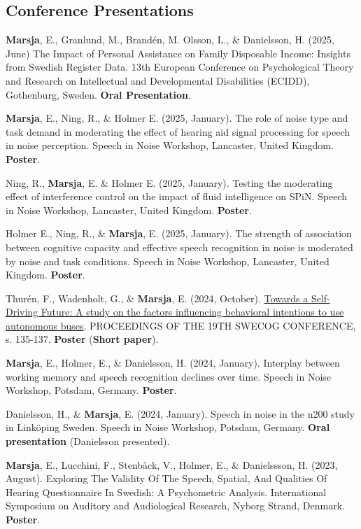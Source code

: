 \documentclass[]{article}
\begin{document}
\subsection{Conference Presentations}\label{conference-presentations}

\textbf{Marsja}, E., Granlund, M., Brandén, M. Olsson, L., \&
Danielsson, H. (2025, June) The Impact of Personal Assistance on Family
Disposable Income: Insights from Swedish Register Data. 13th European
Conference on Psychological Theory and Research on Intellectual and
Developmental Disabilities (ECIDD), Gothenburg, Sweden. \textbf{Oral
Presentation}.

\textbf{Marsja}, E., Ning, R., \& Holmer E. (2025, January). The role of
noise type and task demand in moderating the effect of hearing aid
signal processing for speech in noise perception. Speech in Noise
Workshop, Lancaster, United Kingdom. \textbf{Poster}.

Ning, R., \textbf{Marsja}, E. \& Holmer E. (2025, January). Testing the
moderating effect of interference control on the impact of fluid
intelligence on SPiN. Speech in Noise Workshop, Lancaster, United
Kingdom. \textbf{Poster}.

Holmer E., Ning, R., \& \textbf{Marsja}, E. (2025, January). The
strength of association between cognitive capacity and effective speech
recognition in noise is moderated by noise and task conditions. Speech
in Noise Workshop, Lancaster, United Kingdom. \textbf{Poster}.

Thurén, F., Wadenholt, G., \& \textbf{Marsja}, E. (2024, October).
\href{https://swecog.se/files/SweCog2024_Proceedings.pdf}{Towards a
Self-Driving Future: A study on the factors influencing behavioral
intentions to use autonomous buses}. PROCEEDINGS OF THE 19TH SWECOG
CONFERENCE, s. 135-137. \textbf{Poster} (\textbf{Short paper}).

\textbf{Marsja}, E., Holmer, E., \& Danielsson, H. (2024, January).
Interplay between working memory and speech recognition declines over
time. Speech in Noise Workshop, Potsdam, Germany. \textbf{Poster}.

Danielsson, H., \& \textbf{Marsja}, E. (2024, January). Speech in noise
in the n200 study in Linköping Sweden. Speech in Noise Workshop,
Potsdam, Germany. \textbf{Oral presentation} (Danielsson presented).

\textbf{Marsja}, E., Lucchini, F., Stenbäck, V., Holmer, E., \&
Danielssson, H. (2023, August). Exploring The Validity Of The Speech,
Spatial, And Qualities Of Hearing Questionnaire In Swedish: A
Psychometric Analysis. International Symposium on Auditory and
Audiological Research, Nyborg Strand, Denmark. \textbf{Poster}.
\end{document}
